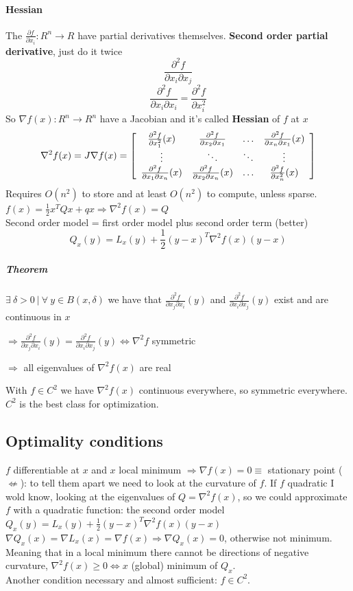\documentclass[10pt]{report}
\begin{document}
\paragraph{Hessian} The $\frac{\partial f}{\partial x_i}:R^n\rightarrow R$ have partial derivatives themselves. \textbf{Second order partial derivative}, just do it twice $$\frac{\partial^2 f}{\partial x_i \partial x_j}$$ $$\frac{\partial^2 f}{\partial x_i \partial x_i}=\frac{\partial^2 f}{\partial x_i^2}$$
So $\nabla f(x) : R^n \rightarrow R^n$ have a Jacobian and it's called \textbf{Hessian} of $f$ at $x$
$$\nabla^2 f(x) = J\nabla f(x) = \left[ \begin{array}{c c c c}
\frac{\partial^2 f}{\partial x_1^2}(x) & \frac{\partial^2 f}{\partial x_2\partial x_1} & \ldots & \frac{\partial^2 f}{\partial x_n\partial x_1}(x)\\
\vdots&\ddots&\ddots&\vdots\\
\frac{\partial^2 f}{\partial x_1\partial x_n}(x) & \frac{\partial^2 f}{\partial x_2\partial x_n}(x) & \ldots & \frac{\partial^2 f}{\partial x_n^2}(x)\\
\end{array}\right]$$
Requires $O(n^2)$ to store and at least $O(n^2)$ to compute, unless sparse.\\
$f(x) = \frac{1}{2}x^TQx + qx \Rightarrow \nabla^2 f(x) = Q$\\
Second order model = first order model plus second order term (better)
$$Q_x(y) = L_x(y) + \frac{1}{2}(y-x)^T\nabla^2f(x)(y-x)$$
\subparagraph{Theorem} $\exists\:\delta>0\:|\:\forall\:y\in B(x, \delta)$ we have that $\frac{\partial^2 f}{\partial x_j\partial x_i}(y)$ and $\frac{\partial^2 f}{\partial x_i\partial x_j}(y)$ exist and are continuous in $x$\begin{list}{}{}
	\item $\Rightarrow \frac{\partial^2 f}{\partial x_j\partial x_i}(y) = \frac{\partial^2 f}{\partial x_i\partial x_j}(y) \Leftrightarrow \nabla^2 f$ symmetric
	\item $\Rightarrow$ all eigenvalues of $\nabla^2 f(x)$ are real
\end{list}
With $f\in C^2$ we have $\nabla^2 f(x)$ continuous everywhere, so symmetric everywhere. $C^2$ is the best class for optimization.
\subsection{Optimality conditions}
$f$ differentiable at $x$ and $x$ local minimum $\Rightarrow \nabla f(x) = 0 \equiv$ stationary point ($\not\Leftarrow$): to tell them apart we need to look at the curvature of $f$. If $f$ quadratic I wold know, looking at the eigenvalues of $Q = \nabla^2 f(x)$, so we could approximate $f$ with a quadratic function: the second order model $Q_x(y) = L_x(y) + \frac{1}{2}(y-x)^T\nabla^2f(x)(y-x)$\\
$\nabla Q_x(x) = \nabla L_x(x) = \nabla f(x) \Rightarrow \nabla Q_x(x) = 0$, otherwise not minimum. Meaning that in a local minimum there cannot be directions of negative curvature, $\nabla^2 f(x) \geq 0 \Leftrightarrow x$ (global) minimum of $Q_x$.\\
Another condition necessary and almost sufficient: $f\in C^2$.
\end{document}
